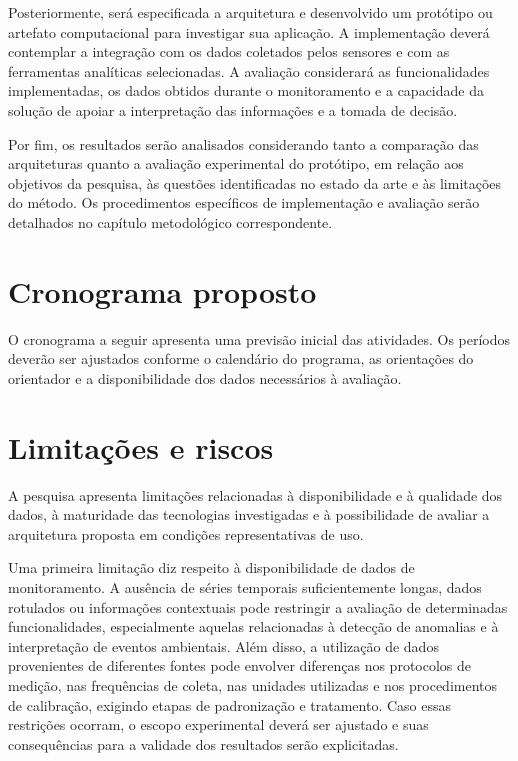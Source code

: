 Posteriormente, será especificada a arquitetura e desenvolvido um protótipo ou artefato computacional para investigar sua aplicação. A implementação deverá contemplar a integração com os dados coletados pelos sensores e com as ferramentas analíticas selecionadas. A avaliação considerará as funcionalidades implementadas, os dados obtidos durante o monitoramento e a capacidade da solução de apoiar a interpretação das informações e a tomada de decisão.

Por fim, os resultados serão analisados considerando tanto a comparação das arquiteturas quanto a avaliação experimental do protótipo, em relação aos objetivos da pesquisa, às questões identificadas no estado da arte e às limitações do método. Os procedimentos específicos de implementação e avaliação serão detalhados no capítulo metodológico correspondente.

\section{Cronograma proposto}
\label{sec:cronograma}

O cronograma a seguir apresenta uma previsão inicial das atividades. Os períodos deverão ser ajustados conforme o calendário do programa, as orientações do orientador e a disponibilidade dos dados necessários à avaliação.




\section{Limitações e riscos}
\label{sec:limitacoes-riscos}

A pesquisa apresenta limitações relacionadas à disponibilidade e à qualidade dos dados, à maturidade das tecnologias investigadas e à possibilidade de avaliar a arquitetura proposta em condições representativas de uso.

Uma primeira limitação diz respeito à disponibilidade de dados de monitoramento. A ausência de séries temporais suficientemente longas, dados rotulados ou informações contextuais pode restringir a avaliação de determinadas funcionalidades, especialmente aquelas relacionadas à detecção de anomalias e à interpretação de eventos ambientais. Além disso, a utilização de dados provenientes de diferentes fontes pode envolver diferenças nos protocolos de medição, nas frequências de coleta, nas unidades utilizadas e nos procedimentos de calibração, exigindo etapas de padronização e tratamento. Caso essas restrições ocorram, o escopo experimental deverá ser ajustado e suas consequências para a validade dos resultados serão explicitadas.

